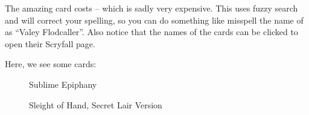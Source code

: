 \documentclass[a4paper]{scrartcl}
\begin{document}
	The amazing card  costs  -- which is sadly very expensive.
	This uses fuzzy search and will correct your spelling, so you can do something like misspell the name of  as \enquote{Valey Flodcaller}.
	Also notice that the names of the cards can be clicked to open their Scryfall page.

	Here, we see some cards:
	\begin{figure}[h]
		\caption{Sublime Epiphany}
	\end{figure}
	\begin{figure}[h]
		\caption{Sleight of Hand, Secret Lair Version}
	\end{figure}
\end{document}
